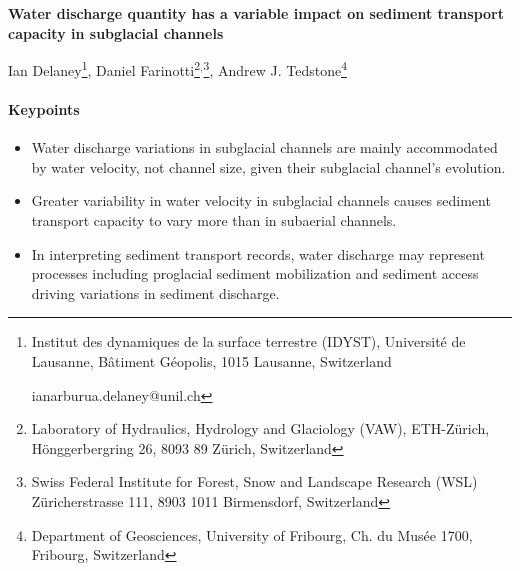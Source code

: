\documentclass[11pt]{article}
\begin{document}
% 
% 


\begin{center}
  \Large{\textbf{Water discharge quantity has a variable impact on sediment transport capacity in subglacial channels}}
  \normalsize

  Ian Delaney\footnote{Institut des dynamiques de la surface terrestre (IDYST), Universit\'{e} de Lausanne, B\^{a}timent G\'{e}opolis, 1015 Lausanne, Switzerland 

    ianarburua.delaney@unil.ch},
  Daniel Farinotti\footnote{Laboratory of Hydraulics, Hydrology and Glaciology (VAW), ETH-Z\"urich, H\"onggerbergring 26, 8093 89 Z\"urich, Switzerland}$^{,}$\footnote{Swiss Federal Institute for Forest, Snow and Landscape Research (WSL) Z\"uricherstrasse 111, 8903 1011 Birmensdorf, Switzerland},
  Andrew J. Tedstone\footnote{Department of Geosciences, University of Fribourg, Ch. du Musée 1700, Fribourg, Switzerland}

  

\end{center}
\paragraph{Keypoints}
\begin{itemize}
\item Water discharge variations in subglacial channels are mainly accommodated by water velocity, not channel size, given their subglacial channel's evolution.

\item Greater variability in water velocity in subglacial channels causes sediment transport capacity to vary more than in subaerial channels.

\item In interpreting sediment transport records, water discharge may represent processes including proglacial sediment mobilization and sediment access driving variations in sediment discharge.
\end{itemize}
\end{document}
